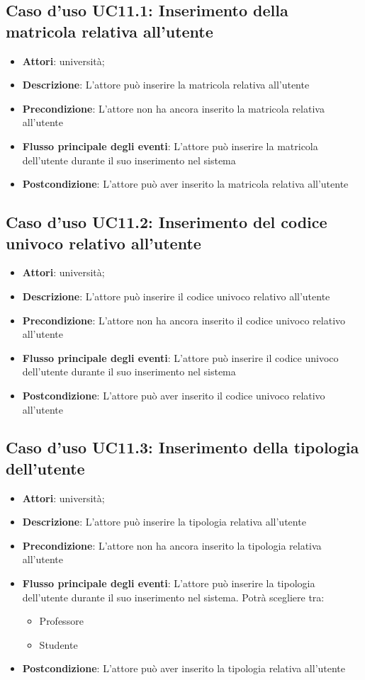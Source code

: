 \subsection{Caso d'uso \texorpdfstring{UC11.1}{UC11.1}: Inserimento della matricola relativa all'utente}
\begin{itemize}
\item \textbf{Attori}: università;
\item \textbf{Descrizione}: L'attore può inserire la matricola relativa all'utente
\item \textbf{Precondizione}: L'attore non ha ancora inserito la matricola relativa all'utente
\item \textbf{Flusso principale degli eventi}: L'attore può inserire la matricola dell'utente durante il suo inserimento nel sistema
\item \textbf{Postcondizione}: L'attore può aver inserito la matricola relativa all'utente
\end{itemize}
\subsection{Caso d'uso \texorpdfstring{UC11.2}{UC11.2}: Inserimento del codice univoco relativo all'utente}
\begin{itemize}
\item \textbf{Attori}: università;
\item \textbf{Descrizione}: L'attore può inserire il codice univoco relativo all'utente
\item \textbf{Precondizione}: L'attore non ha ancora inserito il codice univoco relativo all'utente
\item \textbf{Flusso principale degli eventi}: L'attore può inserire il codice univoco dell'utente durante il suo inserimento nel sistema
\item \textbf{Postcondizione}: L'attore può aver inserito il codice univoco relativo all'utente
\end{itemize}
\subsection{Caso d'uso \texorpdfstring{UC11.3}{UC11.3}: Inserimento della tipologia dell'utente}
\begin{itemize}
\item \textbf{Attori}: università;
\item \textbf{Descrizione}: L'attore può inserire la tipologia relativa all'utente
\item \textbf{Precondizione}: L'attore non ha ancora inserito la tipologia relativa all'utente
\item \textbf{Flusso principale degli eventi}: L'attore può inserire la tipologia dell'utente durante il suo inserimento nel sistema. Potrà scegliere tra:
\begin{itemize}
\item Professore
\item Studente
\end{itemize}
\item \textbf{Postcondizione}: L'attore può aver inserito la tipologia relativa all'utente
\end{itemize}
